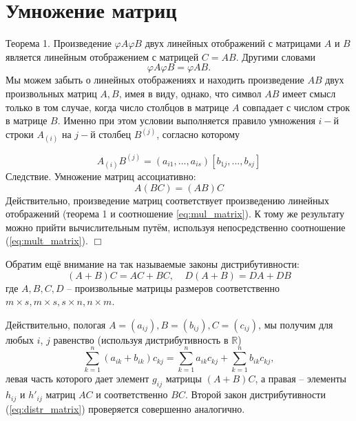 \documentclass[a4paper, 12pt]{article} %
\begin{document}
\clearpage

\section*{Умножение матриц}
Теорема 1. Произведение $\varphi A \varphi B$ двух линейных отображений с матрицами $A$ и $B$ является линейным отображением с матрицей $C = AB$. Другими словами
\begin{equation}
    \varphi A \varphi B = \varphi AB.
    \label{eq:mul_matrix}
\end{equation}
Мы можем забыть о линейных отображениях и находить произведение $AB$ двух произвольных матриц $A, B$, имея в виду, однако, что символ $AB$ имеет смысл только в том случае, когда число  столбцов в матрице $A$ совпадает с числом строк в матрице $B$. Именно при этом условии выполняется правило умножения $i-$й строки $A_{(i)}$ на $j-$й столбец $B^{(j)}$, согласно которому

\begin{equation}
    A_{(i)}B^{(j)} = (a_{i 1}, ..., a_{i s})[b_{1 j}, ..., b_{s j}]
    \label{eq:mult_matrix}
\end{equation}
Следствие. Умножение матриц ассоциативно:
\begin{equation}
    A(BC) = (AB)C
\end{equation}
Действительно, произведение матриц соответствует произведению линейных отображений (теорема 1 и соотношение \ref{eq:mul_matrix}). К тому же результату можно прийти вычислительным путём, используя непосредственно соотношение (\ref{eq:mult_matrix}). $\Box$

Обратим ещё внимание на так называемые законы дистрибутивности:
\begin{equation}
    (A + B)C = AC + BC, ~~~~~ D(A + B) = DA + DB
    \label{eq:distr_matrix}
\end{equation}
где $A, B, C, D$ -- произвольные матрицы размеров соответственно $m \times s, m \times s, s \times n, n \times m.$

Действительно, пологая $A = (a_{ij}), B = (b_{ij}), C = (c_{ij})$, мы получим для любых $i$, $j$ равенство (используя дистрибутивность в $\mathbb{R}$)
\begin{equation}
    \sum^n_{k = 1} (a_{ik} + b_{ik})c_{kj} = \sum^n_{k=1} a_{ik} c_{kj} + \sum^n_{k = 1} b_{ik} c_{kj},
\end{equation}
левая часть которого дает элемент $g_{ij}$ матрицы $(A + B)C$, а правая -- элементы $h_{ij}$ и $h'_{ij}$ матриц $AC$ и соответственно $BC$. Второй закон дистрибутивности (\ref{eq:distr_matrix}) проверяется совершенно аналогично.
\end{document}
